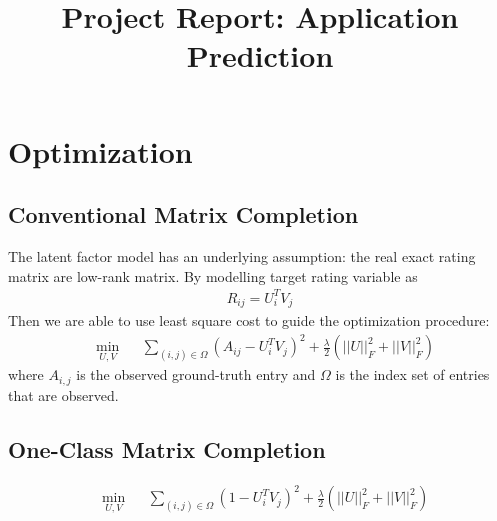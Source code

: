 \documentclass{article} %
\title{Project Report: Application Prediction}
\author{
}
\newtheorem{remark}{Remark}
\begin{document}
\maketitle

\section{Optimization}
\subsection{Conventional Matrix Completion}
The latent factor model has an underlying assumption: the real exact rating matrix are
low-rank matrix. By modelling target rating variable as 
\begin{align}
    R_{ij} = U_i^T V_j 
\end{align}
Then we are able to use least square cost to guide the optimization procedure: 
\begin{equation}
    \begin{aligned}
        &\min_{U,V} 
        && \sum_{(i,j)\in \Omega} (A_{ij} - U_i^T V_j)^2
        + \frac{\lambda}{2}(||U||_F^2 + ||V||_F^2)
    \end{aligned}
\end{equation}
where $A_{i,j}$ is the observed ground-truth entry and $\Omega$ is the index set of
entries that are observed. 

\subsection{One-Class Matrix Completion}
\begin{equation}
    \begin{aligned}
        &\min_{U,V} 
        && \sum_{(i,j)\in \Omega} (1 - U_i^T V_j)^2
        + \frac{\lambda}{2}(||U||_F^2 + ||V||_F^2)
    \end{aligned}
\end{equation}
\end{document}
